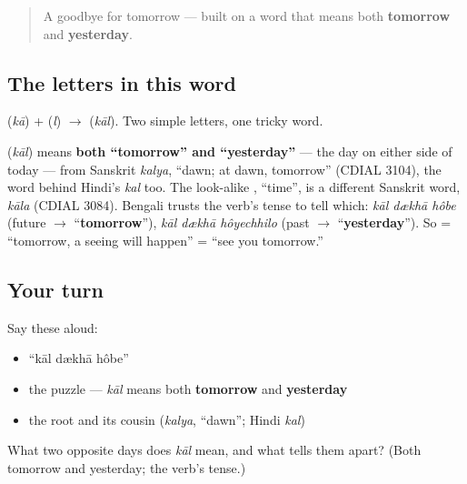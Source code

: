 \label{lesson:BN-C04-kal-dekha-hobe}



\begin{quote}
A goodbye for tomorrow — built on a word that means both \textbf{tomorrow} and \textbf{yesterday}.
\end{quote}

\subsection*{The letters in this word}
\textbf{} (\emph{kā}) + \textbf{} (\emph{l}) $\to$ \textbf{} (\emph{kāl}). Two simple letters, one tricky word.

\begin{cousinweb}
\textbf{} (\emph{kāl}) means \textbf{both \textquotedblleft{}tomorrow\textquotedblright{} and \textquotedblleft{}yesterday\textquotedblright{}} — the day on either side of today — from Sanskrit \emph{kalya}, \textquotedblleft{}dawn; at dawn, tomorrow\textquotedblright{} (CDIAL 3104), the word behind Hindi's \emph{kal} too. The look-alike \textbf{}, \textquotedblleft{}time\textquotedblright{}, is a different Sanskrit word, \emph{kāla} (CDIAL 3084). Bengali trusts the verb's tense to tell which: \emph{kāl dækhā hôbe} (future $\to$ \textquotedblleft{}\textbf{tomorrow}\textquotedblright{}), \emph{kāl dækhā hôyechhilo} (past $\to$ \textquotedblleft{}\textbf{yesterday}\textquotedblright{}). So \textbf{  } = \textquotedblleft{}tomorrow, a seeing will happen\textquotedblright{} = \textquotedblleft{}see you tomorrow.\textquotedblright{}
\end{cousinweb}

\subsection*{Your turn}
Say these aloud:

\begin{itemize}
\raggedright
  \item \textquotedblleft{}kāl dækhā hôbe\textquotedblright{}
  \item the puzzle — \emph{kāl} means both \textbf{tomorrow} and \textbf{yesterday}
  \item the root and its cousin (\emph{kalya}, \textquotedblleft{}dawn\textquotedblright{}; Hindi \emph{kal})
\end{itemize}

\begin{tcolorbox}[breakable,colback=teal!4,colframe=teal!35!black,title={Before you move on}]
What two opposite days does \emph{kāl} mean, and what tells them apart? (Both tomorrow and yesterday; the verb's tense.)
\end{tcolorbox}
